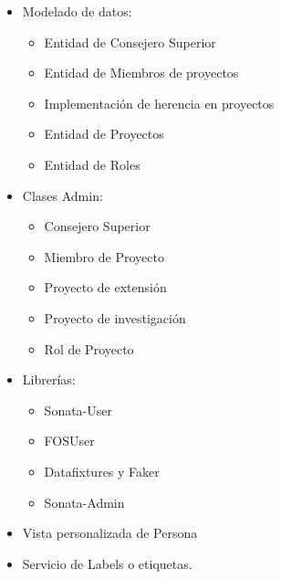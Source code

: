 \begin{itemize}
    \item Modelado de datos:
    \begin{itemize}
        \item Entidad de Consejero Superior
        \item Entidad de Miembros de proyectos
        \item Implementación de herencia en proyectos
        \item Entidad de Proyectos
        \item Entidad de Roles
    \end{itemize}
    \item Clases Admin:
    \begin{itemize}
        \item Consejero Superior
        \item Miembro de Proyecto
        \item Proyecto de extensión
        \item Proyecto de investigación
        \item Rol de Proyecto
    \end{itemize}
    \item Librerías:
    \begin{itemize}
        \item Sonata-User
        \item FOSUser
        \item Datafixtures y Faker
        \item Sonata-Admin
    \end{itemize}
    \item Vista personalizada de Persona
    \item Servicio de Labels o etiquetas.
\end{itemize}
